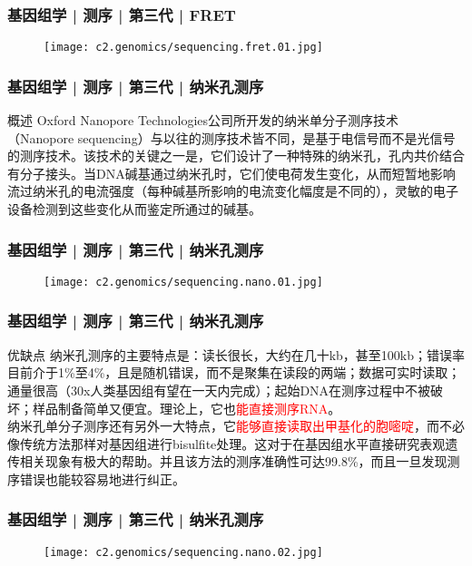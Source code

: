 \begin{frame}
  \frametitle{基因组学 | 测序 | 第三代 | FRET}
  \begin{figure}
    \centering
    \texttt{[image: c2.genomics/sequencing.fret.01.jpg]}
  \end{figure}
\end{frame}

\begin{frame}
  \frametitle{基因组学 | 测序 | 第三代 | 纳米孔测序}
  \begin{block}{概述}
Oxford Nanopore Technologies公司所开发的纳米单分子测序技术（Nanopore sequencing）与以往的测序技术皆不同，是基于电信号而不是光信号的测序技术。该技术的关键之一是，它们设计了一种特殊的纳米孔，孔内共价结合有分子接头。当DNA碱基通过纳米孔时，它们使电荷发生变化，从而短暂地影响流过纳米孔的电流强度（每种碱基所影响的电流变化幅度是不同的），灵敏的电子设备检测到这些变化从而鉴定所通过的碱基。
  \end{block}
\end{frame}

\begin{frame}
  \frametitle{基因组学 | 测序 | 第三代 | 纳米孔测序}
  \begin{figure}
    \centering
    \texttt{[image: c2.genomics/sequencing.nano.01.jpg]}
  \end{figure}
\end{frame}

\begin{frame}
  \frametitle{基因组学 | 测序 | 第三代 | 纳米孔测序}
  \begin{block}{优缺点}
纳米孔测序的主要特点是：读长很长，大约在几十kb，甚至100kb；错误率目前介于1\%至4\%，且是随机错误，而不是聚集在读段的两端；数据可实时读取；通量很高（30x人类基因组有望在一天内完成）；起始DNA在测序过程中不被破坏；样品制备简单又便宜。理论上，它也\textcolor{red}{能直接测序RNA}。\\
\vspace{1em}
纳米孔单分子测序还有另外一大特点，它\textcolor{red}{能够直接读取出甲基化的胞嘧啶}，而不必像传统方法那样对基因组进行bisulfite处理。这对于在基因组水平直接研究表观遗传相关现象有极大的帮助。并且该方法的测序准确性可达99.8\%，而且一旦发现测序错误也能较容易地进行纠正。
  \end{block}
\end{frame}

\begin{frame}
  \frametitle{基因组学 | 测序 | 第三代 | 纳米孔测序}
  \begin{figure}
    \centering
    \texttt{[image: c2.genomics/sequencing.nano.02.jpg]}
  \end{figure}
\end{frame}

